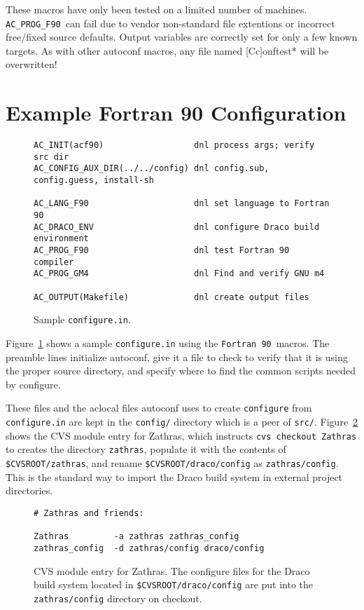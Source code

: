 \documentclass[11pt]{nmemo}
\newcommand{\fninety}{\texttt{Fortran~90}}
\newcommand{\progfninety}{\texttt{AC\_PROG\_F90}}
\begin{document}
These macros have only been tested on a limited number of machines.
\progfninety\ can fail due to vendor non-standard file extentions or
incorrect free/fixed source defaults.  Output variables are correctly
set for only a few known targets.  As with other autoconf macros, any
file named [Cc]onftest* will be overwritten!

\section{Example Fortran 90 Configuration}

\begin{figure}[hbt]
\hrulefill
\begin{verbatim}
AC_INIT(acf90)                  dnl process args; verify src dir
AC_CONFIG_AUX_DIR(../../config) dnl config.sub, config.guess, install-sh

AC_LANG_F90                     dnl set language to Fortran 90
AC_DRACO_ENV                    dnl configure Draco build environment
AC_PROG_F90                     dnl test Fortran 90 compiler
AC_PROG_GM4                     dnl Find and verify GNU m4

AC_OUTPUT(Makefile)             dnl create output files
\end{verbatim}
\caption{Sample \texttt{configure.in}.}\label{fig:configure}
\hrulefill
\end{figure}

Figure~\ref{fig:configure} shows a sample \texttt{configure.in} using
the \fninety\ macros.  The preamble lines initialize autoconf, give it
a file to check to verify that it is using the proper source
directory, and specify where to find the common scripts needed by
configure.  

These files and the aclocal files autoconf uses to create
\texttt{configure} from \texttt{configure.in} are kept in the
\texttt{config/} directory which is a peer of \texttt{src/}.
Figure~\ref{fig:zathras} shows the CVS module entry for Zathras, which
instructs \texttt{cvs checkout Zathras} to creates the directory
\texttt{zathras}, populate it with the contents of
\texttt{\$CVSROOT/zathras}, and rename \texttt{\$CVSROOT/draco/config}
as \texttt{zathras/config}.  This is the standard way to import the
Draco build system in external project directories.
\begin{figure}[hbt]
\hrulefill
\begin{verbatim}
# Zathras and friends:

Zathras         -a zathras zathras_config
zathras_config  -d zathras/config draco/config
\end{verbatim}
\caption{CVS module entry for Zathras.  The configure files for the
Draco build system located in \texttt{\$CVSROOT/draco/config} are put
into the \texttt{zathras/config} directory on
checkout.}\label{fig:zathras}
\hrulefill
\end{figure}
\end{document}
